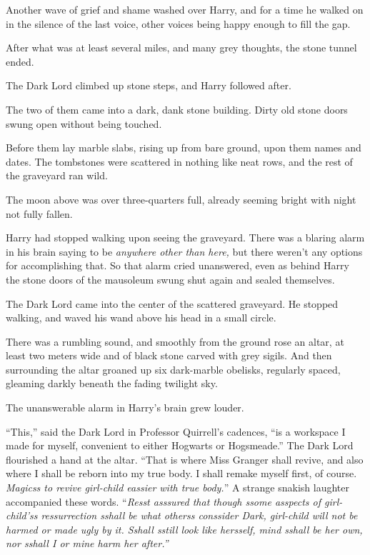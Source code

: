 Another wave of grief and shame washed over Harry, and for a time he walked on in the silence of the last voice, other voices being happy enough to fill the gap.

After what was at least several miles, and many grey thoughts, the stone tunnel ended.

The Dark Lord climbed up stone steps, and Harry followed after.

The two of them came into a dark, dank stone building. Dirty old stone doors swung open without being touched.

Before them lay marble slabs, rising up from bare ground, upon them names and dates. The tombstones were scattered in nothing like neat rows, and the rest of the graveyard ran wild.

The moon above was over three-quarters full, already seeming bright with night not fully fallen.

Harry had stopped walking upon seeing the graveyard. There was a blaring alarm in his brain saying to be \emph{anywhere other than here,} but there weren't any options for accomplishing that. So that alarm cried unanswered, even as behind Harry the stone doors of the mausoleum swung shut again and sealed themselves.

The Dark Lord came into the center of the scattered graveyard. He stopped walking, and waved his wand above his head in a small circle.

There was a rumbling sound, and smoothly from the ground rose an altar, at least two meters wide and of black stone carved with grey sigils. And then surrounding the altar groaned up six dark-marble obelisks, regularly spaced, gleaming darkly beneath the fading twilight sky.

The unanswerable alarm in Harry's brain grew louder.

``This,'' said the Dark Lord in Professor Quirrell's cadences, ``is a workspace I made for myself, convenient to either Hogwarts or Hogsmeade.'' The Dark Lord flourished a hand at the altar. ``That is where Miss Granger shall revive, and also where I shall be reborn into my true body. I shall remake myself first, of course. \emph{Magicss to revive girl-child eassier with true body.}'' A strange snakish laughter accompanied these words. ``\emph{Resst asssured that though ssome asspects of girl-child'ss ressurrection sshall be what otherss conssider Dark, girl-child will not be harmed or made ugly by it. Sshall sstill look like hersself, mind sshall be her own, nor sshall I or mine harm her after.''}

